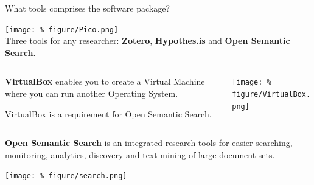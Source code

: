 \documentclass[unknownkeysallowed,usepdftitle=false, parskip=full, aspectratio=169]{beamer}
\newcommand{\secvariable}{nothing}
\newcommand{\mysection}[1]{\renewcommand{\secvariable}{#1}
}
\begin{document}
\mysection{radar}
\begin{frame}\label{\secvariable}

What tools comprises the software package?

\texttt{[image: \%
figure/Pico.png]}\\Three tools for any researcher: \textbf{Zotero}, \textbf{Hypothes.is} and \textbf{Open Semantic Search}.

\end{frame}

\mysection{line}
\begin{frame}\label{\secvariable}

  \begin{columns}[t]
  \begin{column}[c]{0.3\textwidth}
\textbf{VirtualBox} enables you to create a Virtual Machine where you can run another Operating System.\par
\vspace{0.5cm}
VirtualBox is a requirement for Open Semantic Search.

    \end{column}
    \begin{column}[c]{0.7\textwidth}
    \parbox{\linewidth}{
  \texttt{[image: \%
figure/VirtualBox.png]}\\  

}
    \end{column}
    
  \end{columns}


\end{frame}


\mysection{major}
\begin{frame}\label{\secvariable} %

\textbf{Open Semantic Search} is an integrated research tools for easier searching, monitoring, analytics, discovery and text mining of large document sets.
  \vspace{0.5cm}

\texttt{[image: \%
figure/search.png]} 


\end{frame}
\end{document}
